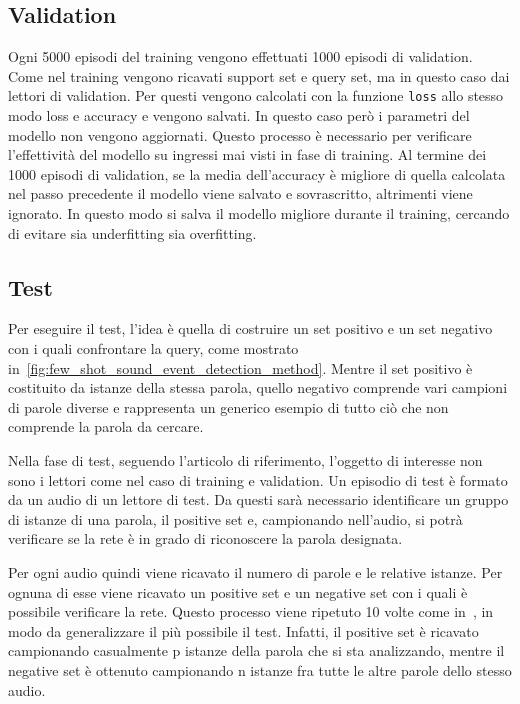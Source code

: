 \documentclass[12pt,a4paper,titlepage]{article}
\begin{document}
\subsection{Validation}
\label{subsec:proto_validation}
Ogni 5000 episodi del training vengono effettuati 1000 episodi di validation.
Come nel training vengono ricavati support set e query set, ma in questo caso dai lettori di validation.
Per questi vengono calcolati con la funzione \texttt{loss} allo stesso modo loss e accuracy e vengono salvati.
In questo caso però i parametri del modello non vengono aggiornati.
Questo processo è necessario per verificare l'effettività del modello su ingressi mai visti in fase di training.
Al termine dei 1000 episodi di validation, se la media dell'accuracy è migliore di quella calcolata nel passo precedente il modello viene salvato e sovrascritto, altrimenti viene ignorato. In questo modo si salva il modello migliore durante il training, cercando di evitare sia underfitting sia overfitting.


\subsection{Test}
\label{subsec:proto_test}
Per eseguire il test, l'idea è quella di costruire un set positivo e un set negativo con i quali confrontare la query, come mostrato in~\ref{fig:few_shot_sound_event_detection_method}. Mentre il set positivo è costituito da istanze della stessa parola, quello negativo comprende vari campioni di parole diverse e rappresenta un generico esempio di tutto ciò che non comprende la parola da cercare.

Nella fase di test, seguendo l'articolo di riferimento, l'oggetto di interesse non sono i lettori come nel caso di training e validation. Un episodio di test è formato da un audio di un lettore di test. Da questi sarà necessario identificare un gruppo di istanze di una parola, il positive set e, campionando nell'audio, si potrà verificare se la rete è in grado di riconoscere la parola designata.


Per ogni audio quindi viene ricavato il numero di parole e le relative istanze.
Per ognuna di esse viene ricavato un positive set e un negative set con i quali è possibile verificare la rete.
Questo processo viene ripetuto 10 volte come in~\cite{Salamon:Few-Shot}, in modo da generalizzare il più possibile il test.
Infatti, il positive set è  ricavato campionando casualmente p istanze della parola che si sta analizzando, mentre il negative set è ottenuto campionando n istanze fra tutte le altre parole dello stesso audio.
\end{document}
